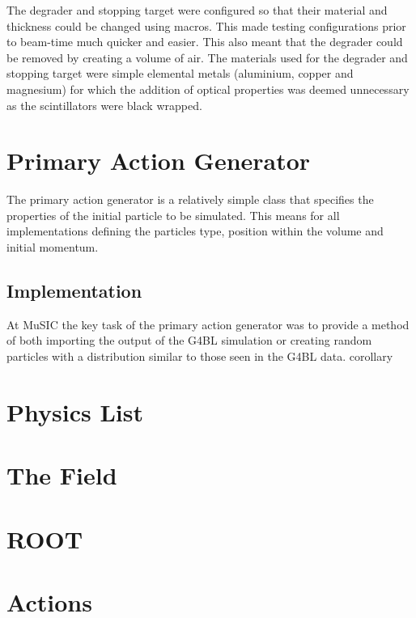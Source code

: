 The degrader and stopping target were configured so that their material and thickness could be changed using macros. This made testing configurations prior to beam-time much quicker and easier. This also meant that the degrader could be removed by creating a volume of air. The materials used for the degrader and stopping target were simple elemental metals (aluminium, copper and magnesium) for which the addition of optical properties was deemed unnecessary as the scintillators were black wrapped.

\section{Primary Action Generator} %
\label{sec:primary_action_generator}
The primary action generator is a relatively simple class that specifies the properties of the initial particle to be simulated. This means for all implementations defining the particles type, position within the volume and initial momentum. 

\subsection{Implementation} %
\label{sub:implementation}
At MuSIC the key task of the primary action generator was to provide a method of both importing the output of the G4BL simulation or creating random particles with a distribution similar to those seen in the G4BL data. 
corollary

\section{Physics List} %
\label{sec:physics_list}

\section{The Field} %
\label{sec:the_field}

\section{ROOT} %
\label{sec:root}

\section{Actions} %
\label{sec:actions}
